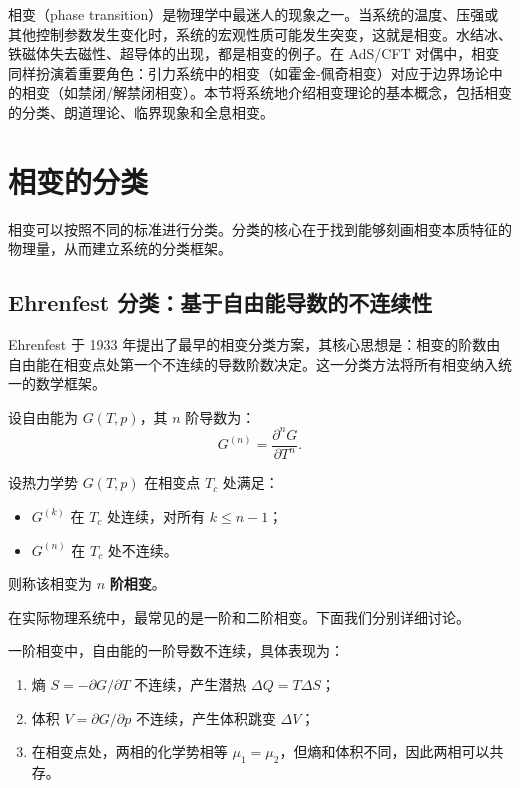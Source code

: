 

相变（phase transition）是物理学中最迷人的现象之一。当系统的温度、压强或其他控制参数发生变化时，系统的宏观性质可能发生突变，这就是相变。水结冰、铁磁体失去磁性、超导体的出现，都是相变的例子。在 AdS/CFT 对偶中，相变同样扮演着重要角色：引力系统中的相变（如霍金-佩奇相变）对应于边界场论中的相变（如禁闭/解禁闭相变）\cite{Witten1998b}。本节将系统地介绍相变理论的基本概念，包括相变的分类、朗道理论、临界现象和全息相变。

\section{相变的分类}

相变可以按照不同的标准进行分类。分类的核心在于找到能够刻画相变本质特征的物理量，从而建立系统的分类框架。

\subsection{Ehrenfest 分类：基于自由能导数的不连续性}

\begin{note}
Ehrenfest 于 1933 年提出了最早的相变分类方案，其核心思想是：相变的阶数由自由能在相变点处第一个不连续的导数阶数决定。这一分类方法将所有相变纳入统一的数学框架。
\end{note}

设自由能为 $G(T, p)$，其 $n$ 阶导数为：
\begin{equation}
    G^{(n)} = \frac{\partial^n G}{\partial T^n}.
\end{equation}

\begin{definition}[$n$ 阶相变]
设热力学势 $G(T,p)$ 在相变点 $T_c$ 处满足：
\begin{itemize}
    \item $G^{(k)}$ 在 $T_c$ 处连续，对所有 $k \leq n-1$；
    \item $G^{(n)}$ 在 $T_c$ 处不连续。
\end{itemize}
则称该相变为 $n$ \textbf{阶相变}。
\end{definition}

在实际物理系统中，最常见的是一阶和二阶相变。下面我们分别详细讨论。

\begin{property}[一阶相变的特征]
一阶相变中，自由能的一阶导数不连续，具体表现为：
\begin{enumerate}
    \item 熵 $S = -\partial G/\partial T$ 不连续，产生潜热 $\Delta Q = T \Delta S$；
    \item 体积 $V = \partial G/\partial p$ 不连续，产生体积跳变 $\Delta V$；
    \item 在相变点处，两相的化学势相等 $\mu_1 = \mu_2$，但熵和体积不同，因此两相可以共存。
\end{enumerate}
\end{property}

